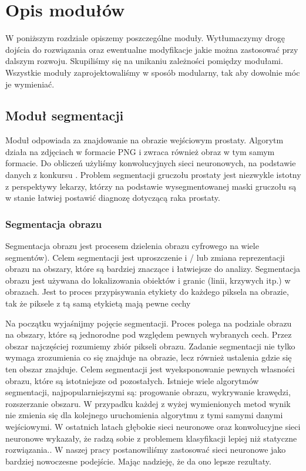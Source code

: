 \documentclass[a4paper,11pt,twoside]{report}
\theoremstyle{definition}
\begin{document}
\chapter{Opis modułów}

W poniższym rozdziale opiszemy poszczególne moduły. Wytłumaczymy drogę dojścia do rozwiązania oraz ewentualne modyfikacje jakie można zastosować przy dalszym rozwoju. Skupiliśmy się na unikaniu zależności pomiędzy modułami. Wszystkie moduły zaprojektowaliśmy w sposób modularny, tak aby dowolnie móc je wymieniać. 

\section{Moduł segmentacji}

Moduł odpowiada za znajdowanie na obrazie wejściowym prostaty. Algorytm działa na zdjęciach w formacie PNG i zwraca również obraz w tym samym formacie. Do obliczeń użyliśmy konwolucyjnych sieci neuronowych, na podstawie danych z konkursu \cite{konkurs}. Problem segmentacji gruczołu prostaty jest niezwykle istotny z perspektywy lekarzy, którzy na podstawie wysegmentowanej maski gruczołu są w stanie łatwiej postawić diagnozę dotyczącą raka prostaty.

\subsection{Segmentacja obrazu}

Segmentacja obrazu jest procesem dzielenia obrazu cyfrowego na wiele segmentów). Celem segmentacji jest uproszczenie i / lub zmiana reprezentacji obrazu na obszary, które są bardziej znaczące i łatwiejsze do analizy. Segmentacja obrazu jest używana do lokalizowania obiektów i granic (linii, krzywych itp.) w obrazach. Jest to proces przypisywania etykiety do każdego piksela na obrazie, tak że piksele z tą samą etykietą mają pewne cechy

Na początku wyjaśnijmy pojęcie segmentacji. Proces polega na podziale obrazu na  obszary, które są jednorodne pod względem pewnych wybranych cech. Przez obszar najczęściej rozumiemy zbiór pikseli obrazu. Zadanie segmentacji nie tylko wymaga zrozumienia co się znajduje na obrazie, lecz również ustalenia gdzie się ten obszar znajduje. Celem segmentacji jest wyeksponowanie  pewnych własności obrazu, które są istotniejsze od pozostałych. Istnieje wiele algorytmów segmentacji, najpopularniejszymi są: progowanie obrazu, wykrywanie krawędzi, rozszerzanie obszaru. W przypadku każdej z wyżej wymienionych metod wynik nie zmienia się dla kolejnego uruchomienia algorytmu z tymi samymi danymi wejściowymi. W ostatnich latach głębokie sieci neuronowe oraz konwolucyjne sieci neuronowe wykazały, że radzą sobie z problemem klasyfikacji lepiej niż statyczne rozwiązania.\cite{imageOrg}. W naszej pracy postanowiliśmy zastosować sieci neuronowe jako bardziej nowoczesne podejście. Mając nadzieję, że da ono lepsze rezultaty. 
\end{document}
